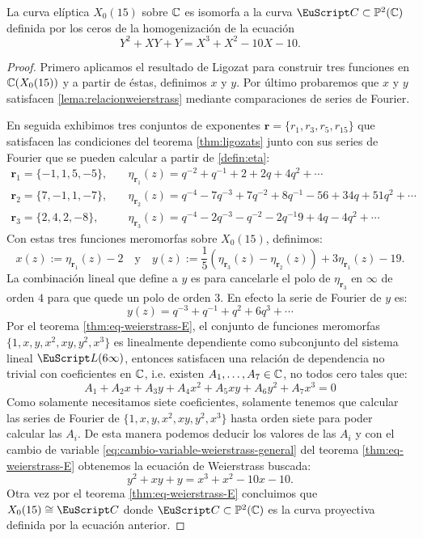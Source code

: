 \documentclass[../../tesis_maestria]{subfiles}
\begin{document}
\begin{lema}\label{lema:eqweierstrassX_0(15)}
	La curva elíptica $X_0(15)$ sobre $\mathbb{C}$ es isomorfa a la curva $\Cc\subset\PP^2(\CC)$ definida por los ceros de la homogenización de la ecuación
	\begin{equation}\label{lema:relacionweierstrass}
		Y^2+XY+Y=X^3+X^2-10X-10.
	\end{equation}
\end{lema}
\begin{proof}
Primero aplicamos el resultado de Ligozat para construir tres funciones en $\mathbb{C}(X_0(15))$ y a partir de éstas, definimos $x$ y $y$. Por último probaremos que $x$ y $y$ satisfacen \eqref{lema:relacionweierstrass} mediante comparaciones de series de Fourier.

En seguida exhibimos tres conjuntos de exponentes $\mathbf{r}=\{r_1,r_3,r_5,r_{15}\}$ que satisfacen las condiciones del teorema \ref{thm:ligozats} junto con sus series de Fourier que se pueden calcular a partir de \eqref{defin:eta}:
\begin{align*}
	\mathbf{r}_1=\{-1,1,5,-5\},\quad& \eta_{\mathbf{r}_1}(z)=q^{-2}+q^{-1}+2+2q+4q^2+\cdots\\
	\mathbf{r}_2=\{7,-1,1,-7\},\quad& \eta_{\mathbf{r}_2}(z)=q^{-4}-7q^{-3}+7q^{-2}+8q^{-1}-56+34q+51q^2+\cdots\\
	\mathbf{r}_3=\{2,4,2,-8\},\quad&  \eta_{\mathbf{r}_3}(z)=q^{-4}-2q^{-3}-q^{-2}-2q^{-1}9+4q-4q^2+\cdots
\end{align*}
Con estas tres funciones meromorfas sobre $X_0(15)$, definimos:
\[
	x(z):=\eta_{\mathbf{r}_1}(z)-2
	\quad\text{y}\quad
	y(z):=\frac{1}{5}(\eta_{\mathbf{r}_3}(z)-\eta_{\mathbf{r}_2}(z))+3\eta_{\mathbf{r}_1}(z)-19.
\]
La combinación lineal que define a $y$ es para cancelarle el polo de $\eta_{\mathbf{r}_3}$ en $\infty$ de orden $4$ para que quede un polo de orden 3.  En efecto la serie de Fourier de $y$ es:
\[
	y(z)=q^{-3}+q^{-1}+q^2+6q^3+\cdots
\]
 Por el teorema \ref{thm:eq-weierstrass-E}, el conjunto de funciones meromorfas $\{1,x,y,x^2,xy,y^2,x^3\}$ es linealmente dependiente como subconjunto del sistema lineal $\Ll(6\infty)$, entonces satisfacen una relación de dependencia no trivial con coeficientes en $\mathbb{C}$, i.e. existen $A_1,\ldots,A_7\in\mathbb{C}$, no todos cero tales que:
 \[
 A_1+A_2x+A_3y+A_4x^2+A_5xy+A_6y^2+A_7x^3=0
 \]
Como solamente necesitamos siete coeficientes, solamente tenemos que calcular las series de Fourier de $\{1,x,y,x^2,xy,y^2,x^3\}$ hasta orden siete para poder calcular las $A_i$. De esta manera podemos deducir los valores de las $A_i$ y con el cambio de variable \eqref{eq:cambio-variable-weierstrass-general} del teorema \ref{thm:eq-weierstrass-E} obtenemos la ecuación de Weierstrass buscada:
	\[
		y^2+xy+y=x^3+x^2-10x-10.	
	\]
Otra vez por el teorema \ref{thm:eq-weierstrass-E} concluimos que $X_0(15)\cong\Cc$ donde $\Cc\subset\PP^2(\CC)$ es la curva proyectiva definida por la ecuación anterior.
\end{proof}
\end{document}
